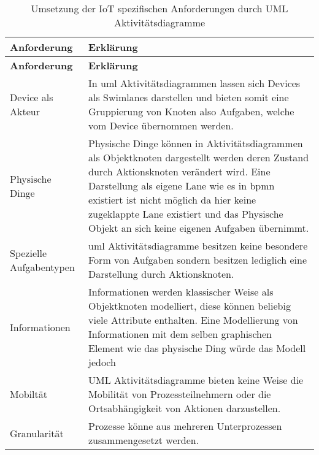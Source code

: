  \begin{longtable}{P{4cm}|X}
  \caption{Umsetzung der IoT spezifischen Anforderungen durch UML Aktivitätsdiagramme}\\
  \label{table:evaluierungskriterien}
  \textbf{Anforderung} & \textbf{Erklärung}   \\ \hline
  \endfirsthead %
  \textbf{Anforderung} & \textbf{Erklärung}  \\ \hline
  \endhead %
  Device als Akteur & In \ac{uml} Aktivitätsdiagrammen lassen sich Devices als Swimlanes darstellen und bieten somit eine Gruppierung von Knoten also Aufgaben, welche vom Device übernommen werden.\\ \hline
  Physische Dinge  & Physische Dinge können in Aktivitätsdiagrammen als Objektknoten dargestellt werden deren Zustand durch Aktionsknoten verändert wird. Eine Darstellung als eigene Lane wie es in \ac{bpmn} existiert ist nicht möglich da hier keine zugeklappte Lane existiert und das Physische Objekt an sich keine eigenen Aufgaben übernimmt.\\ \hline
  Spezielle Aufgabentypen & \ac{uml} Aktivitätsdiagramme besitzen keine besondere Form von Aufgaben sondern besitzen lediglich eine Darstellung durch Aktionsknoten. \\ \hline
  Informationen  & Informationen werden klassischer Weise als Objektknoten modelliert, diese können beliebig viele Attribute enthalten. Eine Modellierung von Informationen mit dem selben graphischen Element wie das physische Ding würde das Modell jedoch \\ \hline
  Mobiltät & UML Aktivitätsdiagramme bieten keine Weise die Mobilität von Prozessteilnehmern oder die Ortsabhängigkeit von Aktionen darzustellen.\\ \hline
  Granularität & Prozesse könne aus mehreren Unterprozessen zusammengesetzt werden.\\
 \end{longtable}
